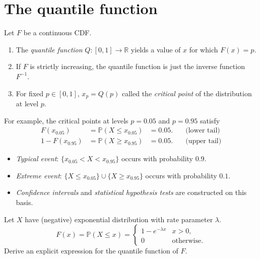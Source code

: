\documentclass[lecture]{csm}
\newcommand{\prob}{\mathbb{P}}
\newcommand{\R}{\mathbb{R}}
\def\it{\item}
\def\bit{\begin{itemize}}
\def\eit{\end{itemize}}
\def\ben{\begin{enumerate}}
\def\een{\end{enumerate}}
\begin{document}
\newpage
\section{The quantile function}
Let $F$ be a continuous CDF.
\ben
\it The \emph{quantile function} $Q:[0,1]\to\R$ yields a value of $x$ for which $F(x)=p$.
\it If $F$ is strictly increasing, the quantile function is just the inverse function $F^{-1}$.
\it For fixed $p\in[0,1]$, $x_p = Q(p)$ called the \emph{critical point} of the distribution at level $p$.
\een

For example, the critical points at levels $p=0.05$ and $p=0.95$ satisfy
\[\begin{array}{rlll}
F(x_{0.05}) & = \prob(X\leq x_{0.05}) & = 0.05. 		& \quad\text{(lower tail)} \\
1-F(x_{0.95}) & = \prob(X\geq x_{0.95}) & = 0.05. 	& \quad\text{(upper tail)}
\end{array}\]

\begin{remark}
\bit
\it \emph{Typical event}: $\{x_{0.05} < X < x_{0.95}\}$ occurs with probability $0.9$. 
\it \emph{Extreme event}: $\{X\leq x_{0.05}\}\cup\{X\geq x_{0.95}\}$ occurs with probability $0.1$.
\it \emph{Confidence intervals} and \emph{statistical hypothesis tests} are constructed on this basis.
\eit
\end{remark}
\begin{example}
Let $X$ have (negative) exponential distribution with rate parameter $\lambda$. %
\[
F(x) = \prob(X\leq x) = \begin{cases}
	1 - e^{-\lambda x}	& x > 0, \\
	0					& \text{otherwise.}
\end{cases}
\]
Derive an explicit expression for the quantile function of $F$.
\end{example}
\end{document}
